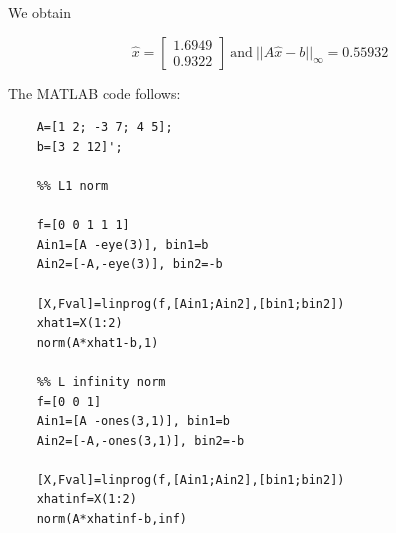 \documentclass[letterpaper]{article}
\begin{document}
\begin{enumerate}
\begin{enumerate}
We obtain

$$\widehat{x} = \left[ \begin{array}{r}1.6949\\0.9322\end{array} \right]~\text{and}~ ||A\widehat{x} -b||_\infty=0.55932$$

\end{enumerate}

The MATLAB code follows:

\begin{verbatim}
    A=[1 2; -3 7; 4 5];
    b=[3 2 12]';

    %% L1 norm

    f=[0 0 1 1 1]
    Ain1=[A -eye(3)], bin1=b
    Ain2=[-A,-eye(3)], bin2=-b

    [X,Fval]=linprog(f,[Ain1;Ain2],[bin1;bin2])
    xhat1=X(1:2)
    norm(A*xhat1-b,1)

    %% L infinity norm
    f=[0 0 1]
    Ain1=[A -ones(3,1)], bin1=b
    Ain2=[-A,-ones(3,1)], bin2=-b

    [X,Fval]=linprog(f,[Ain1;Ain2],[bin1;bin2])
    xhatinf=X(1:2)
    norm(A*xhatinf-b,inf)
    \end{verbatim}

\end{enumerate}
\end{document}

